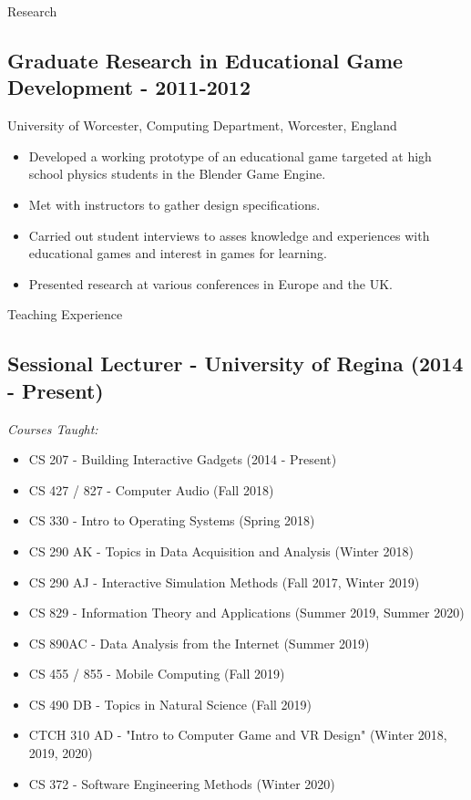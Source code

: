 \documentclass{resume} %
\begin{document}
\begin{rSection}{Research}
\subsection*{Graduate Research in Educational Game Development - 2011-2012}
University of Worcester, Computing Department, Worcester, England
\begin{itemize}
    \item Developed a working prototype of an educational game targeted at high school physics students
    in the Blender Game Engine.
    \item Met with instructors to gather design specifications.
    \item Carried out student interviews to asses knowledge and experiences with educational 
    games and interest in games for learning.
    \item Presented research at various conferences in Europe and the UK. 
\end{itemize}
\end{rSection}

\begin{rSection}{Teaching Experience}
\subsection*{Sessional Lecturer - University of Regina (2014 - Present)}
\emph{Courses Taught:}
\begin{itemize}
    \item CS 207 - Building Interactive Gadgets (2014 - Present)
    \item CS 427 / 827 - Computer Audio (Fall 2018)
    \item CS 330 - Intro to Operating Systems (Spring 2018)
    \item CS 290 AK - Topics in Data Acquisition and Analysis (Winter 2018)
    \item CS 290 AJ - Interactive Simulation Methods (Fall 2017, Winter 2019)
    \item CS 829 - Information Theory and Applications (Summer 2019, Summer 2020)
    \item CS 890AC - Data Analysis from the Internet (Summer 2019)
    \item CS 455 / 855 - Mobile Computing (Fall 2019)
    \item CS 490 DB - Topics in Natural Science (Fall 2019)
    \item CTCH 310 AD - "Intro to Computer Game and VR Design" (Winter 2018, 2019, 2020)
    \item CS 372 - Software Engineering Methods (Winter 2020)
 \end{itemize} 
\end{rSection}
\end{document}
